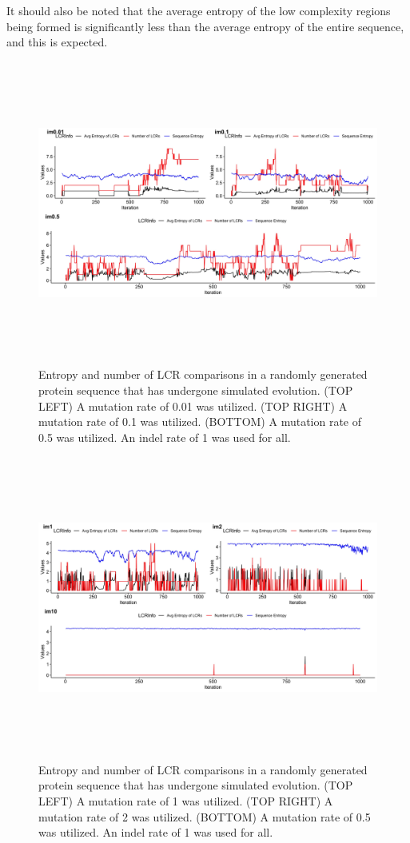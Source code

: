 \documentclass{article}
\begin{document}
It should also be noted that the average entropy of the low complexity regions being formed is significantly less than the average entropy of the entire sequence, and this is expected. 

\begin{figure}[H]
	\includegraphics[width=18cm, height=10cm]{m0.01-0.1-0.5.jpeg}
	\caption{Entropy and number of LCR comparisons in a randomly generated protein sequence that has undergone simulated evolution. (TOP LEFT) A mutation rate of 0.01 was utilized. (TOP RIGHT) A mutation rate of 0.1 was utilized. (BOTTOM) A mutation rate of 0.5 was utilized. An indel rate of 1 was used for all.}
	\label{fig:3}
\end{figure}

\begin{figure}[H]
	\includegraphics[width=18cm, height=10cm]{m1-2-10.jpeg}
	\caption{Entropy and number of LCR comparisons in a randomly generated protein sequence that has undergone simulated evolution. (TOP LEFT) A mutation rate of 1 was utilized. (TOP RIGHT) A mutation rate of 2 was utilized. (BOTTOM) A mutation rate of 0.5 was utilized. An indel rate of 1 was used for all.}
	\label{fig:4}
\end{figure}
\end{document}
